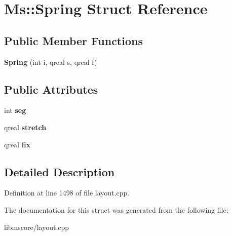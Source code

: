 \hypertarget{struct_ms_1_1_spring}{}\section{Ms\+:\+:Spring Struct Reference}
\label{struct_ms_1_1_spring}
\subsection*{Public Member Functions}
\begin{DoxyCompactItemize}
\item 
\mbox{\label{struct_ms_1_1_spring_ad22ab9409d5f708042ae3ab507af1359}} 
{\bfseries Spring} (int i, qreal s, qreal f)
\end{DoxyCompactItemize}
\subsection*{Public Attributes}
\begin{DoxyCompactItemize}
\item 
\mbox{\label{struct_ms_1_1_spring_a063e8bc40e6f7f909e42f8098f0f485d}} 
int {\bfseries seg}
\item 
\mbox{\label{struct_ms_1_1_spring_a7e0380cc850bb2909bb576c549c7abce}} 
qreal {\bfseries stretch}
\item 
\mbox{\label{struct_ms_1_1_spring_a1cbc2c5ab8e76451bbcc84b0cdc94bd6}} 
qreal {\bfseries fix}
\end{DoxyCompactItemize}


\subsection{Detailed Description}


Definition at line 1498 of file layout.\+cpp.



The documentation for this struct was generated from the following file\+:\begin{DoxyCompactItemize}
\item 
libmscore/layout.\+cpp\end{DoxyCompactItemize}
